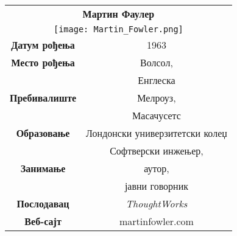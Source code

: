 \documentclass[12pt,a4paper]{article}
\begin{document}
\begin{tabular}{|c|c|}\hline
    \multicolumn{2}{|c|}{\textbf{Мартин Фаулер}}\\
    \multicolumn{2}{|c|}{\texttt{[image: Martin\_Fowler.png]}} \\

    \textbf{Датум рођења} & 1963 \\ \hline
    \textbf{Место рођења} & Волсол, \\
     &  Енглеска \\ \hline
     \textbf{Пребивалиште} & Мелроуз, \\
      & Масачусетс \\ \hline
     \textbf{Образовање} & Лондонски универзитетски колеџ \\ \hline
     & Софтверски инжењер, \\
     \textbf{ Занимање} & аутор, \\
      & јавни говорник \\ \hline
     \textbf{Послодавац} & \emph{ThoughtWorks} \\ \hline
     \textbf{Веб-сајт}	& 	martinfowler.com \\ \hline
\end{tabular}
\newpage
\end{document}
